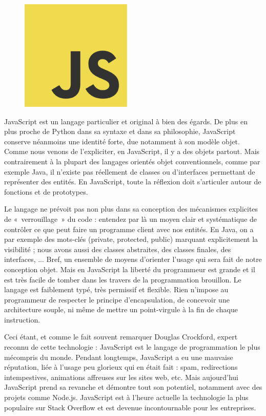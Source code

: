 \documentclass[a4paper,12pt]{article}
\begin{document}
\begin{figure}[!h]
  \begin{center}
    \includegraphics[scale=0.3]{logo-javascript.png}
  \end{center}
\end{figure}

JavaScript est un langage particulier et original à bien des égards. De plus en plus proche de Python dans sa syntaxe et dans sa philosophie, JavaScript conserve néanmoins une identité forte, due notamment à son modèle objet. Comme nous venons de l'expliciter, en JavaScript, il y a des objets partout. Mais contrairement à la plupart des langages orientés objet conventionnels, comme par exemple Java, il n'existe pas réellement de classes ou d'interfaces permettant de représenter des entités. En JavaScript, toute la réflexion doit s'articuler autour de fonctions et de prototypes.

Le langage ne prévoit pas non plus dans sa conception des mécanismes explicites de «~verrouillage~» du code : entendez par là un moyen clair et systématique de contrôler ce que peut faire un programme client avec nos entités. En Java, on a par exemple des mots-clés (private, protected, public) marquant explicitement la visibilité ; nous avons aussi des classes abstraites, des classes finales, des interfaces, ... Bref, un ensemble de moyens d'orienter l'usage qui sera fait de notre conception objet. Mais en JavaScript la liberté du programmeur est grande et il est très facile de tomber dans les travers de la programmation brouillon. Le langage est faiblement typé, très permissif et flexible. Rien n'impose au programmeur de respecter le principe d'encapsulation, de concevoir une architecture souple, ni même de mettre un point-virgule à la fin de chaque instruction.

Ceci étant, et comme le fait souvent remarquer Douglas Crockford, expert reconnu de cette technologie : JavaScript est le langage de programmation le plus mécompris du monde. Pendant longtemps, JavaScript a eu une mauvaise réputation, liée à l'usage peu glorieux qui en était fait : spam, redirections intempestives, animations affreuses sur les sites web, etc. Mais aujourd'hui JavaScript prend sa revanche et démontre tout son potentiel, notamment avec des projets comme Node.js. JavaScript est à l'heure actuelle la technologie la plus populaire sur Stack Overflow et est devenue incontournable pour les entreprises.
\end{document}
